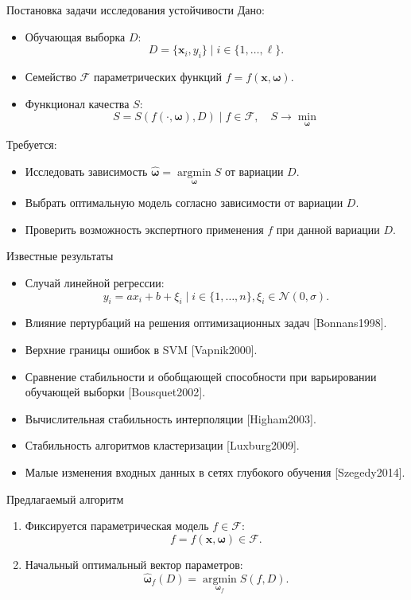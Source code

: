 \documentclass{beamer}
\begin{document}
\begin{frame}{Постановка задачи исследования устойчивости}
  Дано:
  \begin{itemize}
   \item Обучающая выборка $D$:
     \[
	   D = \{ \mathbf{x}_i, y_i \} \mid i \in \{ 1, \dots, \ell \}.
     \]
   \item Семейство $\mathcal{F}$ параметрических функций $f = f(\mathbf{x}, \boldsymbol{\omega})$.
   \item Функционал качества $S$:
     \[
       S = S (f (\cdot, \boldsymbol{\omega}), D) \mid f \in \mathcal{F}, \quad S \rightarrow \mathop{\min}\limits_{\boldsymbol{\omega}}
     \]
  \end{itemize}
  
  Требуется:
  \begin{itemize}
    \item Исследовать зависимость $\hat{\boldsymbol{\omega}} = \mathop{\arg \min}\limits_{\boldsymbol{\omega}} S$ от вариации $D$.
    \item Выбрать оптимальную модель согласно зависимости от вариации $D$.
    \item Проверить возможность экспертного применения $f$ при данной вариации $D$.
  \end{itemize}
\end{frame}

\begin{frame}{Известные результаты}
  \begin{itemize}
    \item Случай линейной регрессии:
      \[
        y_i = ax_i + b + \xi_i \mid i \in \{ 1, \dots, n \}, \xi_i \in \mathcal{N} (0, \sigma).
      \]
    \item Влияние пертурбаций на решения оптимизационных задач [Bonnans1998].
    \item Верхние границы ошибок в SVM [Vapnik2000].
    \item Сравнение стабильности и обобщающей способности при варьировании обучающей выборки [Bousquet2002].
    \item Вычислительная стабильность интерполяции [Higham2003].
    \item Стабильность алгоритмов кластеризации [Luxburg2009].
    \item Малые изменения входных данных в сетях глубокого обучения [Szegedy2014].
  \end{itemize}
\end{frame}

\begin{frame}{Предлагаемый алгоритм}
  \begin{enumerate}
    \item Фиксируется параметрическая модель $f \in \mathcal{F}$:
      \[
        f = f(\mathbf{x}, \boldsymbol{\omega}) \in \mathcal{F}.
      \]
    \item Начальный оптимальный вектор параметров:
      \[
        \hat{\boldsymbol{\omega}}_f(D) = \mathop{\arg \min}\limits_{\boldsymbol{\omega}_f} S(f, D).
      \]
  \end{enumerate}
\end{frame}
\end{document}
